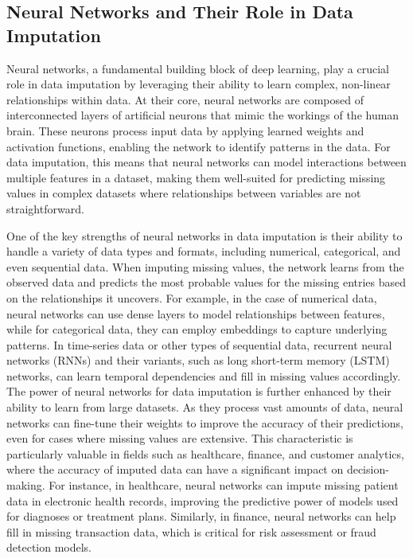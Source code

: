 \documentclass{article}
\begin{document}
\subsection{Neural Networks and Their Role in Data Imputation}
Neural networks, a fundamental building block of deep learning, play a crucial role in data imputation by leveraging their ability to learn complex, non-linear relationships within data. At their core, neural networks are composed of interconnected layers of artificial neurons that mimic the workings of the human brain. These neurons process input data by applying learned weights and activation functions, enabling the network to identify patterns in the data. For data imputation, this means that neural networks can model interactions between multiple features in a dataset, making them well-suited for predicting missing values in complex datasets where relationships between variables are not straightforward.

One of the key strengths of neural networks in data imputation is their ability to handle a variety of data types and formats, including numerical, categorical, and even sequential data. When imputing missing values, the network learns from the observed data and predicts the most probable values for the missing entries based on the relationships it uncovers. For example, in the case of numerical data, neural networks can use dense layers to model relationships between features, while for categorical data, they can employ embeddings to capture underlying patterns. In time-series data or other types of sequential data, recurrent neural networks (RNNs) and their variants, such as long short-term memory (LSTM) networks, can learn temporal dependencies and fill in missing values accordingly.
\\
The power of neural networks for data imputation is further enhanced by their ability to learn from large datasets. As they process vast amounts of data, neural networks can fine-tune their weights to improve the accuracy of their predictions, even for cases where missing values are extensive. This characteristic is particularly valuable in fields such as healthcare, finance, and customer analytics, where the accuracy of imputed data can have a significant impact on decision-making. For instance, in healthcare, neural networks can impute missing patient data in electronic health records, improving the predictive power of models used for diagnoses or treatment plans. Similarly, in finance, neural networks can help fill in missing transaction data, which is critical for risk assessment or fraud detection models. 
\end{document}
